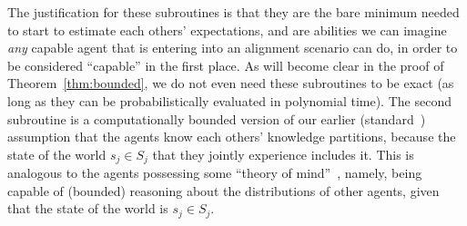 The justification for these subroutines is that they are the bare minimum needed to start to estimate each others' expectations, and are abilities we can imagine \emph{any} capable agent that is entering into an alignment scenario can do, in order to be considered ``capable'' in the first place.
As will become clear in the proof of Theorem~\ref{thm:bounded}, we do not even need these subroutines to be exact (as long as they can be probabilistically evaluated in polynomial time).
The second subroutine is a computationally bounded version of our earlier (standard~\citep{aumann1976agreeing,aumann1999interactive}) assumption that the agents know each others' knowledge partitions, because the state of the world $s_j \in S_j$ that they jointly experience includes it.
This is analogous to the agents possessing some ``theory of mind''~\citep{ho2022planning}, namely, being capable of (bounded) reasoning about the distributions of other agents, given that the state of the world is $s_j \in S_j$.

